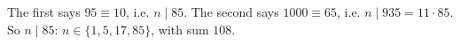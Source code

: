 The first says $95\equiv10$, i.e. $n\mid85$. The second says $1000\equiv65$, i.e. $n\mid935=11\cdot85$. So $n\mid85$: $n\in\{1,5,17,85\}$, with sum $\boxed{108}$.
